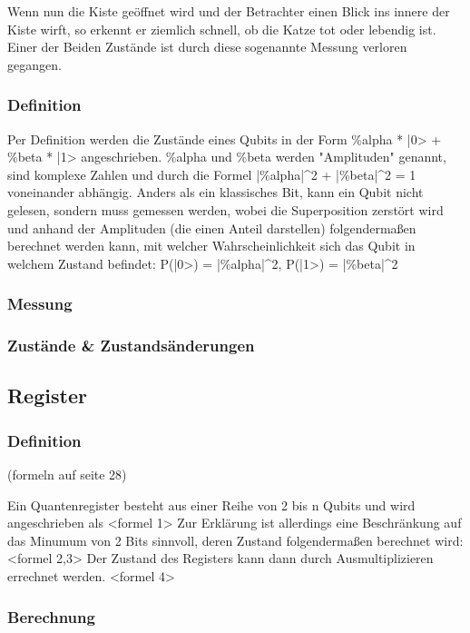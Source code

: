 Wenn nun die Kiste ge\"offnet wird und der Betrachter einen Blick ins innere der Kiste wirft, so erkennt er ziemlich schnell, ob die Katze tot oder lebendig ist. Einer der Beiden Zust\"ande ist durch diese sogenannte Messung verloren gegangen.

\subsubsection{Definition}

Per Definition werden die Zust\"ande eines Qubits in der Form \%alpha * |0> + \%beta * |1> angeschrieben.
\%alpha und \%beta werden "Amplituden" genannt, sind komplexe Zahlen und durch die Formel |\%alpha|^2 + |\%beta|^2 = 1 voneinander abh\"angig.
Anders als ein klassisches Bit, kann ein Qubit nicht gelesen, sondern muss gemessen werden, wobei die Superposition zerst\"ort wird und anhand der Amplituden (die einen Anteil darstellen) folgendermaßen berechnet werden kann, mit welcher Wahrscheinlichkeit sich das Qubit in welchem Zustand befindet: P(|0>) = |\%alpha|^2, P(|1>) = |\%beta|^2

\subsubsection{Messung}

\subsubsection{Zust\"ande & Zustands\"anderungen}

\subsection{Register}
\label{sec:Register}

\subsubsection{Definition}
(formeln auf seite 28)

Ein Quantenregister besteht aus einer Reihe von 2 bis n Qubits und wird angeschrieben als <formel 1>
Zur Erkl\"arung ist allerdings eine Beschr\"ankung auf das Minumum von 2 Bits sinnvoll, deren Zustand folgendermaßen berechnet wird: <formel 2,3>
Der Zustand des Registers kann dann durch Ausmultiplizieren errechnet werden. <formel 4>

\subsubsection{Berechnung}

